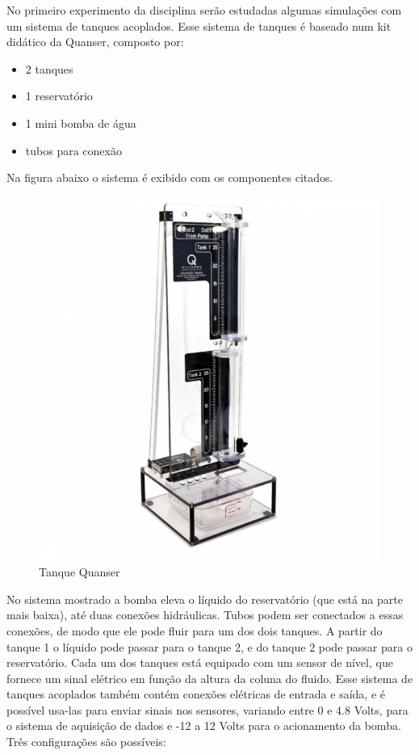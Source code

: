 \documentclass[a4paper,12pt]{article}
\begin{document}
\begin{flushleft}
\hspace{4ex} No primeiro experimento da disciplina serão estudadas algumas simulações com um sistema de tanques acoplados. Esse sistema de tanques é baseado num kit didático da Quanser, composto por:

\begin{itemize}
	\item 2 tanques
	\item 1 reservatório
	\item 1 mini bomba de água
	\item tubos para conexão
\end{itemize}

Na figura abaixo o sistema é exibido com os componentes citados.

\begin{figure}[h]
	\centering
	\includegraphics[scale=0.40]{./imagens/tanque-agua.jpg}
	\caption{Tanque Quanser}
\end{figure}

No sistema mostrado a bomba eleva o líquido do reservatório (que está na parte mais baixa), até duas conexões hidráulicas. Tubos podem ser conectados a essas conexões, de modo que ele pode fluir para um dos dois tanques. A partir do tanque 1 o líquido pode passar para o tanque 2, e do tanque 2 pode passar para o reservatório. Cada um dos tanques está equipado com um sensor de nível, que fornece um sinal elétrico em função da altura da coluna do fluido. Esse sistema de tanques acoplados também contém conexões elétricas de entrada e saída, e é possível usa-las para enviar sinais nos sensores, variando entre 0 e 4.8 Volts, para o sistema de aquisição de dados e -12 a 12 Volts para o acionamento da bomba. Três configurações são possíveis:


\end{flushleft}
\end{document}
